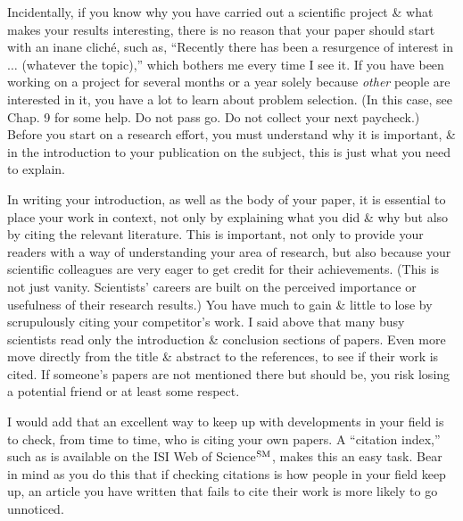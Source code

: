 \documentclass{article}
\numberwithin{equation}{section}
\begin{document}
Incidentally, if you know why you have carried out a scientific project \& what makes your results interesting, there is no reason that your paper should start with an inane clich\'e, such as, ``Recently there has been a resurgence of interest in $\ldots$ (whatever the topic),'' which bothers me every time I see it. If you have been working on a project for several months or a year solely because \textit{other} people are interested in it, you have a lot to learn about problem selection. (In this case, see Chap. 9 for some help. Do not pass go. Do not collect your next paycheck.) Before you start on a research effort, you must understand why it is important, \& in the introduction to your publication on the subject, this is just what you need to explain.

In writing your introduction, as well as the body of your paper, it is essential to place your work in context, not only by explaining what you did \& why but also by citing the relevant literature. This is important, not only to provide your readers with a way of understanding your area of research, but also because your scientific colleagues are very eager to get credit for their achievements. (This is not just vanity. Scientists' careers are built on the perceived importance or usefulness of their research results.) You have much to gain \& little to lose by scrupulously citing your competitor's work. I said above that many busy scientists read only the introduction \& conclusion sections of papers. Even more move directly from the title \& abstract to the references, to see if their work is cited. If someone's papers are not mentioned there but should be, you risk losing a potential friend or at least some respect.

I would add that an excellent way to keep up with developments in your field is to check, from time to time, who is citing your own papers. A ``citation index,'' such as is available on the ISI Web of Science${}^{\rm SM}$, makes this an easy task. Bear in mind as you do this that if checking citations is how people in your field keep up, an article you have written that fails to cite their work is more likely to go unnoticed.
\end{document}

